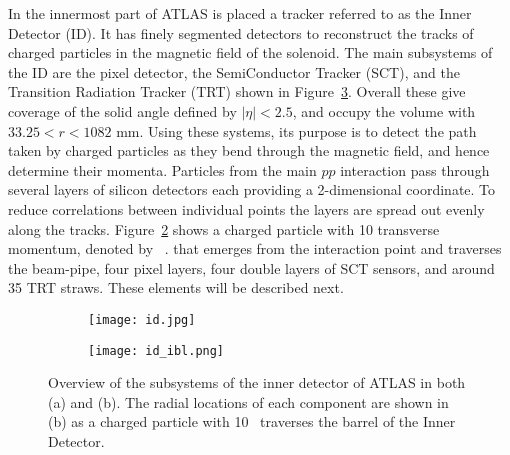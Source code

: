 In the innermost part of ATLAS is placed a tracker referred to as the Inner Detector (ID). 
It has finely segmented detectors to reconstruct the tracks of charged particles in the magnetic field of the solenoid.
The main subsystems of the ID are the pixel detector, the SemiConductor Tracker (SCT), and the Transition Radiation Tracker (TRT)
shown in Figure~\ref{fig:exp.atlas.id}.
Overall these give coverage of the solid angle defined
by $|\eta| < 2.5$, and occupy the volume with $33.25 < r < 1082$ mm. Using these systems,
its purpose is to detect the path taken by charged particles as they bend through the
magnetic field, and hence determine their momenta.
Particles from the main $pp$ interaction pass through several layers of silicon detectors each providing a 2-dimensional coordinate. 
To reduce correlations between individual points the layers are spread out evenly along the tracks.
Figure~\ref{fig:exp.atlas.id.rad} shows a charged particle with 10 \GeV
transverse momentum, denoted by ~\pt. that
emerges from the interaction point and traverses the beam-pipe, four pixel layers, 
four double layers of SCT sensors, and around 35 TRT straws.
These elements will be described next.

\begin{figure}[htb!]
\centering
\begin{subfigure}[t]{0.5\textwidth}
\texttt{[image: id.jpg]}
\subcaption{}
\label{fig:exp.atlas.id.all}
\end{subfigure}
\begin{subfigure}[t]{0.45\textwidth}
\texttt{[image: id\_ibl.png]}
\subcaption{}
\label{fig:exp.atlas.id.rad}
\end{subfigure}
\vspace{-0.25cm}
\caption{Overview of the subsystems of the inner detector of ATLAS in both (a) and (b).
The radial locations of each component are shown in (b) as 
 a charged particle with 10 \GeV~\pt traverses the barrel of the Inner Detector.} %
\label{fig:exp.atlas.id}
\end{figure}


